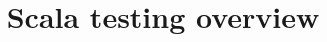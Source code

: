 

\title{Scala testing overview}



\begin{frame}
    \titlepage
\end{frame}

\begin{frame}

\end{frame}





